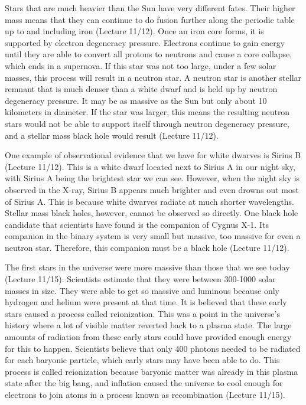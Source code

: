\documentclass[12pt]{article}
\begin{document}
Stars that are much heavier than the Sun have very different fates.  Their
higher mass means that they can continue to do fusion further along the periodic
table up to and including iron (Lecture 11/12).  Once an iron core forms, it is
supported by
electron degeneracy pressure.  Electrons continue to gain energy until they are
able to convert all protons to neutrons and cause a core collapse, which ends in
a supernova.  If this star was not too large, under a few solar masses, this
process will result in a neutron star.  A neutron star is another stellar
remnant that is much denser than a white dwarf and is held up by neutron
degeneracy pressure.  It may be as massive as the Sun but only about 10
kilometers in diameter.  If the star was larger, this means the resulting
neutron stars would not be able to support itself through neutron degeneracy
pressure, and a stellar mass black hole would result (Lecture 11/12).

One example of observational evidence that we have for white dwarves is Sirius
B (Lecture 11/12).  This is a white dwarf located next to Sirius A in our night
sky, with Sirius
A being the brightest star we can see.  However, when the night sky is observed
in the X-ray, Sirius B appears much brighter and even drowns out most of Sirius
A.  This is because white dwarves radiate at much shorter wavelengths.  Stellar
mass black holes, however, cannot be observed so directly.  One black hole
candidate that scientists have found is the companion of Cygnus X-1.  Its
companion in the binary system is very small but massive, too massive for even a
neutron star.  Therefore, this companion must be a black hole (Lecture 11/12).

The first stars in the universe were more massive than those that we see today
(Lecture 11/15).
Scientists estimate that they were between 300-1000 solar masses in size.  They
were able to get so massive and luminous because only hydrogen and helium were
present at that time.  It is believed that these early stars caused a process
called reionization.  This was a point in the universe's history where a lot of
visible matter reverted back to a plasma state.  The large amounts of radiation
from these early stars could have provided enough energy for this to happen.
Scientists believe that only 400 photons needed to be radiated for each baryonic
particle, which early stars may have been able to do.  This process is called
reionization because baryonic matter was already in this plasma state after the
big bang, and inflation caused the universe to cool enough for electrons to join
atoms in a process known as recombination (Lecture 11/15).
\end{document}
